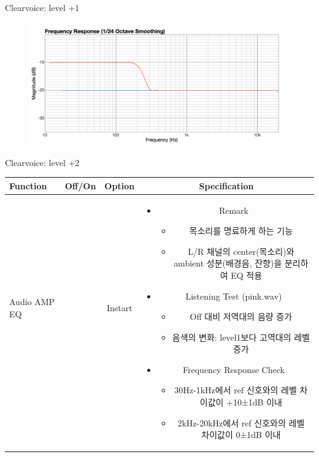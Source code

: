 \documentclass{beamer}
\begin{document}
\begin{frame}[t]{Clearvoice: level +1}
		\begin{figure}[b]
			\includegraphics[height=0.32\textwidth]{figure/cv1.png}
		\end{figure}
		
	\end{frame}
	
	
	\begin{frame}[t]{Clearvoice: level +2}
		\begin{tiny}
			\begin{tabular}{@{}lccc@{}}
				\toprule
				Function & Off/On & Option & Specification \\
				\midrule
				Audio AMP EQ & \color{black}{Off} & Instart &
				\multirow{14}{60mm}{
					\begin{itemize}
						\item Remark
						\begin{itemize}
							\item 목소리를 명료하게 하는 기능
							\item L/R 채널의 center(목소리)와 ambient 성분(배경음, 잔향)을 분리하여 EQ 적용
						\end{itemize}
						\item Listening Test (pink.wav)
						\begin{itemize}
							\item Off 대비 저역대의 음량 증가
							\item 음색의 변화: level1보다 고역대의 레벨 증가
						\end{itemize}
						\item Frequency Response Check
						\begin{itemize}
							\item 30Hz-1kHz에서 ref 신호와의 레벨 차이값이 +10±1dB 이내
							\item 2kHz-20kHz에서 ref 신호와의 레벨 차이값이 0±1dB 이내
						\end{itemize}
					\end{itemize}
				} \\
				 \color{blue}{Clearvoice} & \color{blue}{On} & \color{blue}{+2} & \\

\end{tabular}
\end{tiny}
\end{frame}
\end{document}
